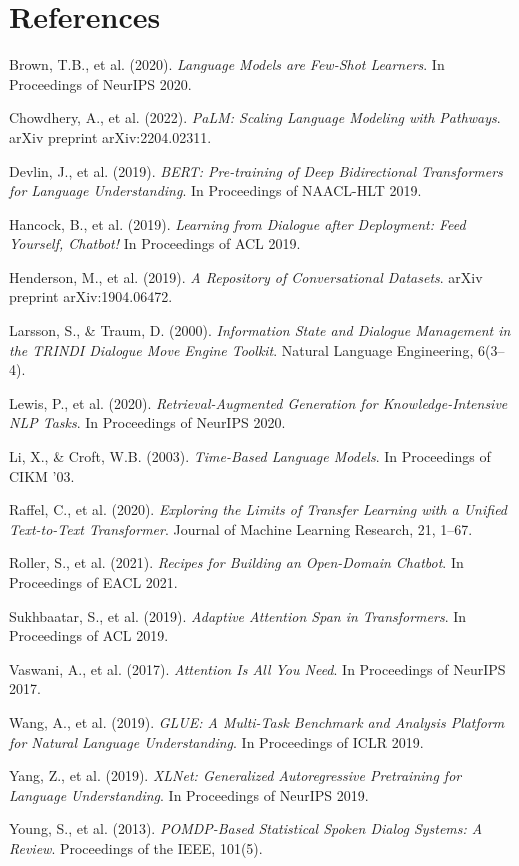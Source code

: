 \documentclass[12pt]{article}
\begin{document}
\section*{References}
\begin{thebibliography}{99}

Brown, T.B., et al. (2020).
\textit{Language Models are Few-Shot Learners}.
In Proceedings of NeurIPS 2020.

Chowdhery, A., et al. (2022).
\textit{PaLM: Scaling Language Modeling with Pathways}.
arXiv preprint arXiv:2204.02311.

Devlin, J., et al. (2019).
\textit{BERT: Pre-training of Deep Bidirectional Transformers for Language Understanding}.
In Proceedings of NAACL-HLT 2019.

Hancock, B., et al. (2019).
\textit{Learning from Dialogue after Deployment: Feed Yourself, Chatbot!}
In Proceedings of ACL 2019.

Henderson, M., et al. (2019).
\textit{A Repository of Conversational Datasets}.
arXiv preprint arXiv:1904.06472.

Larsson, S., \& Traum, D. (2000).
\textit{Information State and Dialogue Management in the TRINDI Dialogue Move Engine Toolkit}.
Natural Language Engineering, 6(3--4).

Lewis, P., et al. (2020).
\textit{Retrieval-Augmented Generation for Knowledge-Intensive NLP Tasks}.
In Proceedings of NeurIPS 2020.

Li, X., \& Croft, W.B. (2003).
\textit{Time-Based Language Models}.
In Proceedings of CIKM '03.

Raffel, C., et al. (2020).
\textit{Exploring the Limits of Transfer Learning with a Unified Text-to-Text Transformer}.
Journal of Machine Learning Research, 21, 1--67.

Roller, S., et al. (2021).
\textit{Recipes for Building an Open-Domain Chatbot}.
In Proceedings of EACL 2021.

Sukhbaatar, S., et al. (2019).
\textit{Adaptive Attention Span in Transformers}.
In Proceedings of ACL 2019.

Vaswani, A., et al. (2017).
\textit{Attention Is All You Need}.
In Proceedings of NeurIPS 2017.

Wang, A., et al. (2019).
\textit{GLUE: A Multi-Task Benchmark and Analysis Platform for Natural Language Understanding}.
In Proceedings of ICLR 2019.

Yang, Z., et al. (2019).
\textit{XLNet: Generalized Autoregressive Pretraining for Language Understanding}.
In Proceedings of NeurIPS 2019.

Young, S., et al. (2013).
\textit{POMDP-Based Statistical Spoken Dialog Systems: A Review}.
Proceedings of the IEEE, 101(5).

\end{thebibliography}
\end{document}

